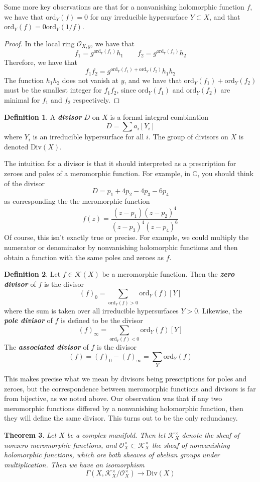 \documentclass[psamsfonts, 12pt]{amsart}
\newtheorem{thm}{Theorem}[section]
\theoremstyle{definition}
\newtheorem{defn}[thm]{Definition}
\theoremstyle{remark}
\renewcommand{\O}{\mathcal{O}}
\newcommand{\ib}[1]{\textbf{\textit{#1}}}
\newcommand{\C}{\mathbb{C}}
\begin{document}
%
Some more key observations are that for a nonvanishing holomorphic function $f$, we have
that $\mathrm{ord}_Y(f) = 0$ for any irreducible hypersurface $Y \subset X$, and
that $\mathrm{ord}_Y(f) = 0 \mathrm{ord}_Y(1/f)$.
%
\begin{proof}
In the local ring $\O_{X,y}$, we have that
\[
f_1 = g^{\mathrm{ord}_Y(f_1)}h_1 \qquad f_2 = g^{\mathrm{ord}_Y(f_2)}h_2
\]
Therefore, we have that
\[
f_1f_2 = g^{\mathrm{ord}_Y(f_1) + \mathrm{ord}_Y(f_2)}h_1h_2
\]
The function $h_1h_2$ does not vanish at $y$, and we have that
$\mathrm{ord}_Y(f_1) + \mathrm{ord}_Y(f_2)$ must be the smallest integer for
$f_1f_2$, since $\mathrm{ord}_Y(f_1)$ and $\mathrm{ord}_Y(f_2)$ are minimal for
$f_1$ and $f_2$ respectively.
\end{proof}
%
\begin{defn}
A \ib{divisor} $D$ on $X$ is a formal integral combination
\[
D = \sum a_i[Y_i]
\]
where $Y_i$ is an irreducible hypersurface for all $i$. The group of divisors on
$X$ is denoted $\mathrm{Div}(X)$.
\end{defn}
%
The intuition for a divisor is that it should interpreted as a prescription for zeroes
and poles of a meromorphic function. For example, in $\C$, you should think of
the divisor
\[
D = p_1 + 4p_2 - 4p_3 - 6p_4
\]
as corresponding the the meromorphic function
\[
f(z) = \frac{(z-p_1)(z-p_2)^4}{(z-p_3)^4(z-p_4)^6}
\]
Of course, this isn't exactly true or precise. For example, we could multiply the
numerator or denominator by nonvanishing holomorphic functions and then obtain a function
with the same poles and zeroes as $f$.
%
\begin{defn}
Let $f \in \mathcal{K}(X)$ be a meromorphic function. Then the \ib{zero divisor} of
$f$ is the divisor
\[
(f)_0 = \sum_{\mathrm{ord}_Y(f) > 0} \mathrm{ord}_Y(f)[Y]
\]
where the sum is taken over all irreducible hypersurfaces $Y > 0$. Likewise, the
\ib{pole divisor} of $f$ is defined to be the divisor
\[
(f)_\infty = \sum_{\mathrm{ord}_Y(f) < 0} \mathrm{ord}_Y(f)[Y]
\]
The \ib{associated divisor} of $f$ is the divisor
\[
(f) = (f)_0 - (f)_\infty = \sum_Y \mathrm{ord}_Y(f)
\]
\end{defn}
%
This makes precise what we mean by divisors being prescriptions for poles and
zeroes, but the correspondence between meromorphic functions and divisors is
far from bijective, as we noted above. Our observation was that if any two meromorphic
functions differed by a nonvanishing holomorphic function, then they will define the
same divisor. This turns out to be the only redundancy.
%
\begin{thm}
Let $X$ be a complex manifold. Then let $\mathcal{K}^\times_X$ denote the sheaf of
nonzero meromorphic functions, and $\O_X^\times \subset \mathcal{K}^\times_X$ the sheaf
of nonvanishing holomorphic functions, which are both sheaves of abelian groups
under multiplication. Then we have an isomorphism
\[
\Gamma(X, \mathcal{K}^\times_X/\O^\times_X) \to \mathrm{Div}(X)
\]
\end{thm}
\end{document}
